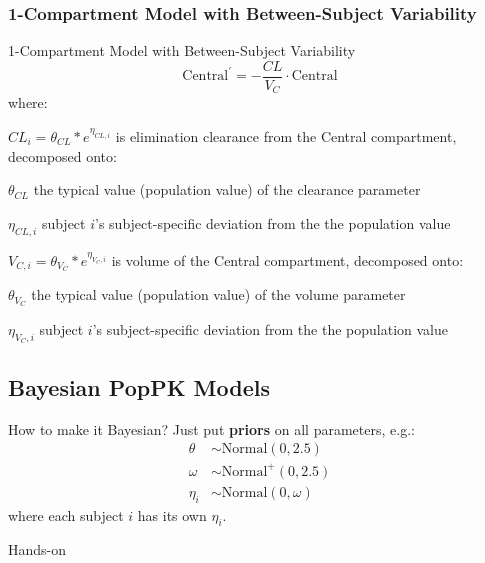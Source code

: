 \subsubsection{1-Compartment Model with Between-Subject Variability}
\begin{frame}{1-Compartment Model with Between-Subject Variability}
    $$
        \text{Central}^{\prime} = -\frac{CL}{V_C} \cdot \text{Central}
    $$
    where:
    \begin{vfilleditems}
        \item $CL_i = \theta_{CL} * e^{\eta_{CL,i}}$ is elimination clearance from the Central compartment,
        decomposed onto:
        \begin{vfilleditems}
            \item $\theta_{CL}$ the typical value (population value) of the clearance parameter
            \item $\eta_{CL, i}$ subject $i$'s subject-specific deviation from the the population value
        \end{vfilleditems}
        \item $V_{C,i} = \theta_{V_C} * e^{\eta_{V_C,i}}$ is volume of the Central compartment,
        decomposed onto:
        \begin{vfilleditems}
            \item $\theta_{V_C}$ the typical value (population value) of the volume parameter
            \item $\eta_{V_C,i}$ subject $i$'s subject-specific deviation from the the population value
        \end{vfilleditems}
    \end{vfilleditems}
\end{frame}

\subsection{Bayesian PopPK Models}
\begin{frame}{How to make it Bayesian?}
    Just put \textbf{priors} on all parameters, e.g.:
    $$
        \begin{aligned}
            \theta   & \sim \text{Normal}(0, 2.5)  \\
            \omega   & \sim \text{Normal}^+(0, 2.5)  \\
            \eta_{i} & \sim \text{Normal}(0, \omega)
        \end{aligned}
    $$
    \vfill
    where each subject $i$ has its own $\eta_i$.
\end{frame}

\begin{frame}{Hands-on}
\end{frame}
